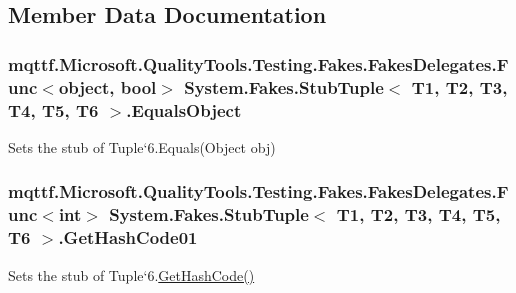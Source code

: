 \subsection{Member Data Documentation}
\hypertarget{class_system_1_1_fakes_1_1_stub_tuple_3_01_t1_00_01_t2_00_01_t3_00_01_t4_00_01_t5_00_01_t6_01_4_a16a8dd17a162e1a7843e7ce37c54bb66}{
\subsubsection[{Equals\-Object}]{\setlength{\rightskip}{0pt plus 5cm}mqttf.\-Microsoft.\-Quality\-Tools.\-Testing.\-Fakes.\-Fakes\-Delegates.\-Func$<$object, bool$>$ System.\-Fakes.\-Stub\-Tuple$<$ T1, T2, T3, T4, T5, T6 $>$.Equals\-Object}}\label{class_system_1_1_fakes_1_1_stub_tuple_3_01_t1_00_01_t2_00_01_t3_00_01_t4_00_01_t5_00_01_t6_01_4_a16a8dd17a162e1a7843e7ce37c54bb66}


Sets the stub of Tuple`6.Equals(\-Object obj)

\hypertarget{class_system_1_1_fakes_1_1_stub_tuple_3_01_t1_00_01_t2_00_01_t3_00_01_t4_00_01_t5_00_01_t6_01_4_a87205f00165713f2f9dc9bda7e891e5f}{
\subsubsection[{Get\-Hash\-Code01}]{\setlength{\rightskip}{0pt plus 5cm}mqttf.\-Microsoft.\-Quality\-Tools.\-Testing.\-Fakes.\-Fakes\-Delegates.\-Func$<$int$>$ System.\-Fakes.\-Stub\-Tuple$<$ T1, T2, T3, T4, T5, T6 $>$.Get\-Hash\-Code01}}\label{class_system_1_1_fakes_1_1_stub_tuple_3_01_t1_00_01_t2_00_01_t3_00_01_t4_00_01_t5_00_01_t6_01_4_a87205f00165713f2f9dc9bda7e891e5f}


Sets the stub of Tuple`6.\hyperlink{class_system_1_1_fakes_1_1_stub_tuple_3_01_t1_00_01_t2_00_01_t3_00_01_t4_00_01_t5_00_01_t6_01_4_a90ab03c90d73a050914af7006ecb88e3}{Get\-Hash\-Code()}

